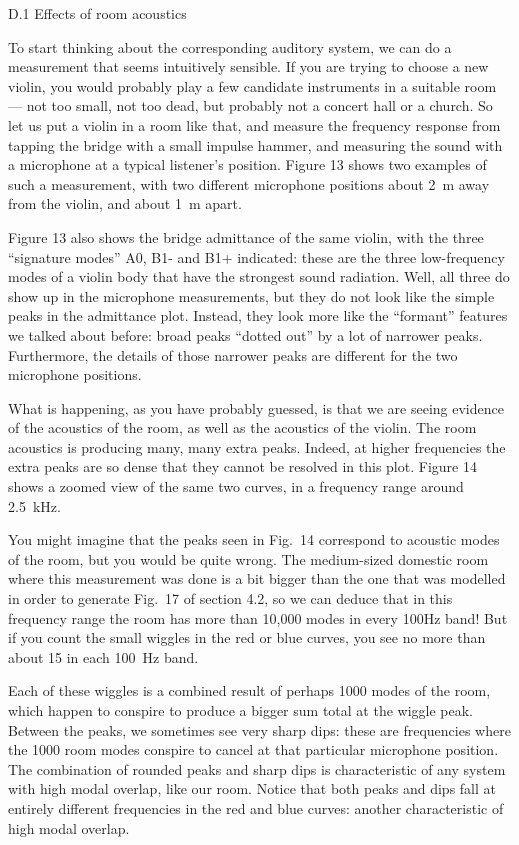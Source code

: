   D.1 Effects of room acoustics 

  To start thinking about the corresponding auditory system, we can do a 
  measurement that seems intuitively sensible. If you are trying to choose a 
  new violin, you would probably play a few candidate instruments in a suitable 
  room — not too small, not too dead, but probably not a concert hall or a 
  church. So let us put a violin in a room like that, and measure the frequency 
  response from tapping the bridge with a small impulse hammer, and measuring 
  the sound with a microphone at a typical listener’s position. Figure 13 shows 
  two examples of such a measurement, with two different microphone positions 
  about 2~m away from the violin, and about 1~m apart. 

  Figure 13 also shows the bridge admittance of the same violin, with the three 
  “signature modes” A0, B1- and B1+ indicated: these are the three 
  low-frequency modes of a violin body that have the strongest sound radiation. 
  Well, all three do show up in the microphone measurements, but they do not 
  look like the simple peaks in the admittance plot. Instead, they look more 
  like the “formant” features we talked about before: broad peaks “dotted out” 
  by a lot of narrower peaks. Furthermore, the details of those narrower peaks 
  are different for the two microphone positions. 

  What is happening, as you have probably guessed, is that we are seeing 
  evidence of the acoustics of the room, as well as the acoustics of the 
  violin. The room acoustics is producing many, many extra peaks. Indeed, at 
  higher frequencies the extra peaks are so dense that they cannot be resolved 
  in this plot. Figure 14 shows a zoomed view of the same two curves, in a 
  frequency range around 2.5~kHz. 

  You might imagine that the peaks seen in Fig.\ 14 correspond to acoustic 
  modes of the room, but you would be quite wrong. The medium-sized domestic 
  room where this measurement was done is a bit bigger than the one that was 
  modelled in order to generate Fig.\ 17 of section 4.2, so we can deduce that 
  in this frequency range the room has more than 10,000 modes in every 100Hz 
  band! But if you count the small wiggles in the red or blue curves, you see 
  no more than about 15 in each 100~Hz band. 

  Each of these wiggles is a combined result of perhaps 1000 modes of the room, 
  which happen to conspire to produce a bigger sum total at the wiggle peak. 
  Between the peaks, we sometimes see very sharp dips: these are frequencies 
  where the 1000 room modes conspire to cancel at that particular microphone 
  position. The combination of rounded peaks and sharp dips is characteristic 
  of any system with high modal overlap, like our room. Notice that both peaks 
  and dips fall at entirely different frequencies in the red and blue curves: 
  another characteristic of high modal overlap. 

